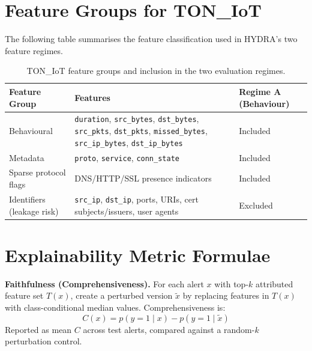 \documentclass[12pt,a4paper]{report}
\begin{document}
\appendix

\chapter{Feature Groups for TON\_IoT}
\label{app:features}

The following table summarises the feature classification used in HYDRA's two feature regimes.

\begin{table}[H]
\centering
\caption{TON\_IoT feature groups and inclusion in the two evaluation regimes.}
\label{tab:features}
\begin{tabular}{p{3.5cm}p{6cm}p{3cm}}
\toprule
\textbf{Feature Group} & \textbf{Features} & \textbf{Regime A (Behaviour)} \\
\midrule
Behavioural & \texttt{duration}, \texttt{src\_bytes}, \texttt{dst\_bytes}, \texttt{src\_pkts}, \texttt{dst\_pkts}, \texttt{missed\_bytes}, \texttt{src\_ip\_bytes}, \texttt{dst\_ip\_bytes} & Included \\
\addlinespace
Metadata & \texttt{proto}, \texttt{service}, \texttt{conn\_state} & Included \\
\addlinespace
Sparse protocol flags & DNS/HTTP/SSL presence indicators & Included \\
\addlinespace
Identifiers (leakage risk) & \texttt{src\_ip}, \texttt{dst\_ip}, ports, URIs, cert subjects/issuers, user agents & Excluded \\
\bottomrule
\end{tabular}
\end{table}

\chapter{Explainability Metric Formulae}
\label{app:formulae}

\noindent\textbf{Faithfulness (Comprehensiveness).} For each alert $x$ with top-$k$ attributed feature set $T(x)$, create a perturbed version $\tilde{x}$ by replacing features in $T(x)$ with class-conditional median values. Comprehensiveness is:
\begin{equation}
C(x) = p(y=1 \mid x) - p(y=1 \mid \tilde{x})
\end{equation}
Reported as mean $C$ across test alerts, compared against a random-$k$ perturbation control.
\end{document}
